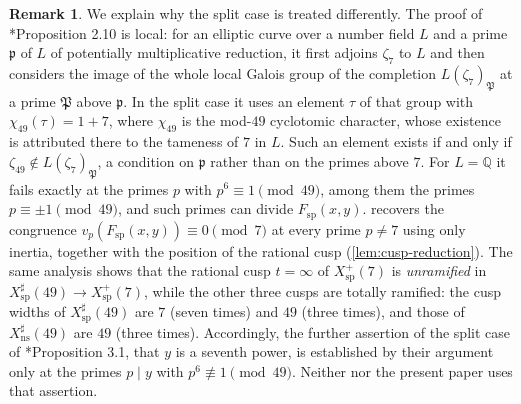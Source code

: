\documentclass[12pt]{amsart}
\newcommand{\Q}{\mathbb{Q}}
\DeclareMathOperator{\ns}{ns}
\DeclareMathOperator{\spc}{sp}
\numberwithin{equation}{section}
\theoremstyle{definition}
\newtheorem{remark}[theorem]{Remark}
\begin{document}
\begin{remark}
  \label{rem:FL-split}
  We explain why the split case is treated differently. The proof of
  \cite{Furio--Lombardo26}*{Proposition 2.10} is local: for an elliptic curve over a number
  field $L$ and a prime $\mathfrak{p}$ of $L$ of potentially multiplicative
  reduction, it first adjoins $\zeta_7$ to $L$ and then considers the image
  of the whole local Galois group of the completion $L(\zeta_7)_{\mathfrak{P}}$
  at a prime $\mathfrak{P}$ above $\mathfrak{p}$. In the split
  case it uses an element $\tau$ of that group with $\chi_{49}(\tau) = 1 + 7$,
  where $\chi_{49}$ is the mod-$49$ cyclotomic character, whose existence is
  attributed there to the tameness of $7$ in $L$. Such an element exists if
  and only if $\zeta_{49} \notin L(\zeta_7)_{\mathfrak{P}}$, a condition on
  $\mathfrak{p}$ rather than on the primes above $7$. For $L = \Q$ it fails
  exactly at the primes $p$ with $p^{6} \equiv 1 \pmod{49}$, among them the
  primes $p \equiv \pm 1 \pmod{49}$, and such primes can divide
  $F_{\spc}(x,y)$.
   recovers the congruence
  $v_p(F_{\spc}(x,y)) \equiv 0 \pmod 7$ at every prime $p \neq 7$ using only
  inertia, together with the position of the rational cusp
  (\cref{lem:cusp-reduction}). The same analysis shows that the rational cusp
  $t = \infty$ of $X_{\spc}^{+}(7)$ is \emph{unramified} in
  $X_{\spc}^{\sharp}(49) \to X_{\spc}^{+}(7)$, while the other three cusps are
  totally ramified: the cusp widths of $X_{\spc}^{\sharp}(49)$ are $7$ (seven
  times) and $49$ (three times), and those of $X_{\ns}^{\sharp}(49)$ are $49$
  (three times). Accordingly, the further assertion of the split case of
  \cite{Furio--Lombardo26}*{Proposition 3.1}, that $y$ is a seventh power, is established
  by their argument only at the primes $p \mid y$ with $p^{6} \not\equiv 1
  \pmod{49}$. Neither \cite{Furio--Lombardo26} nor the present paper uses that assertion.
\end{remark}
\end{document}
